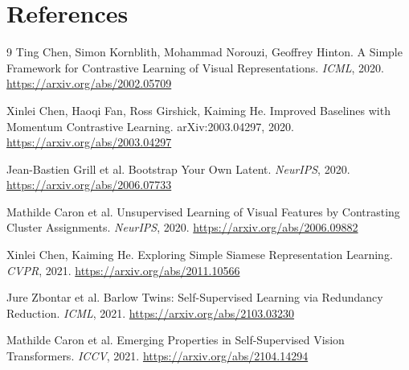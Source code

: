 \documentclass[11pt,a4paper]{article}
\begin{document}
\section*{References}
\begin{thebibliography}{9}
Ting Chen, Simon Kornblith, Mohammad Norouzi, Geoffrey Hinton.
\newblock A Simple Framework for Contrastive Learning of Visual Representations.
\newblock \emph{ICML}, 2020.
\newblock \url{https://arxiv.org/abs/2002.05709}

Xinlei Chen, Haoqi Fan, Ross Girshick, Kaiming He.
\newblock Improved Baselines with Momentum Contrastive Learning.
\newblock arXiv:2003.04297, 2020.
\newblock \url{https://arxiv.org/abs/2003.04297}

Jean-Bastien Grill et al.
\newblock Bootstrap Your Own Latent.
\newblock \emph{NeurIPS}, 2020.
\newblock \url{https://arxiv.org/abs/2006.07733}

Mathilde Caron et al.
\newblock Unsupervised Learning of Visual Features by Contrasting Cluster Assignments.
\newblock \emph{NeurIPS}, 2020.
\newblock \url{https://arxiv.org/abs/2006.09882}

Xinlei Chen, Kaiming He.
\newblock Exploring Simple Siamese Representation Learning.
\newblock \emph{CVPR}, 2021.
\newblock \url{https://arxiv.org/abs/2011.10566}

Jure Zbontar et al.
\newblock Barlow Twins: Self-Supervised Learning via Redundancy Reduction.
\newblock \emph{ICML}, 2021.
\newblock \url{https://arxiv.org/abs/2103.03230}

Mathilde Caron et al.
\newblock Emerging Properties in Self-Supervised Vision Transformers.
\newblock \emph{ICCV}, 2021.
\newblock \url{https://arxiv.org/abs/2104.14294}
\end{thebibliography}
\end{document}
